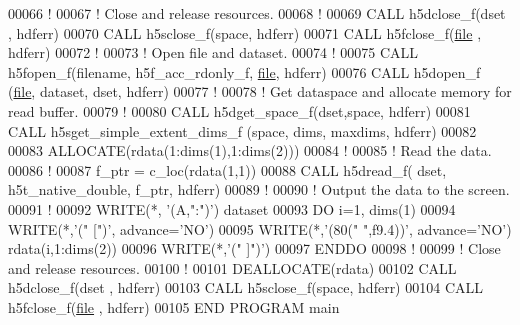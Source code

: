 \begin{DoxyCode}
00066   \textcolor{comment}{!}
00067   \textcolor{comment}{! Close and release resources.}
00068   \textcolor{comment}{!}
00069   \textcolor{keyword}{CALL }h5dclose\_f(dset , hdferr)
00070   \textcolor{keyword}{CALL }h5sclose\_f(space, hdferr)
00071   \textcolor{keyword}{CALL }h5fclose\_f(\hyperlink{structfile}{file} , hdferr)
00072   \textcolor{comment}{!}
00073   \textcolor{comment}{! Open file and dataset.}
00074   \textcolor{comment}{!}
00075   \textcolor{keyword}{CALL }h5fopen\_f(filename, h5f\_acc\_rdonly\_f, \hyperlink{structfile}{file}, hdferr)
00076   \textcolor{keyword}{CALL }h5dopen\_f (\hyperlink{structfile}{file}, dataset, dset, hdferr)
00077   \textcolor{comment}{!}
00078   \textcolor{comment}{! Get dataspace and allocate memory for read buffer.}
00079   \textcolor{comment}{!}
00080   \textcolor{keyword}{CALL }h5dget\_space\_f(dset,space, hdferr)
00081   \textcolor{keyword}{CALL }h5sget\_simple\_extent\_dims\_f (space, dims, maxdims, hdferr)
00082 
00083   \textcolor{keyword}{ALLOCATE}(rdata(1:dims(1),1:dims(2)))
00084   \textcolor{comment}{!}
00085   \textcolor{comment}{! Read the data.}
00086   \textcolor{comment}{!}
00087   f\_ptr = c\_loc(rdata(1,1))
00088   \textcolor{keyword}{CALL }h5dread\_f( dset, h5t\_native\_double, f\_ptr, hdferr)
00089   \textcolor{comment}{!}
00090   \textcolor{comment}{! Output the data to the screen.}
00091   \textcolor{comment}{!}
00092   \textcolor{keyword}{WRITE}(*, \textcolor{stringliteral}{'(A,":")'}) dataset
00093   \textcolor{keywordflow}{DO} i=1, dims(1)
00094      \textcolor{keyword}{WRITE}(*,\textcolor{stringliteral}{'(" [")'}, advance=\textcolor{stringliteral}{'NO'})
00095      \textcolor{keyword}{WRITE}(*,\textcolor{stringliteral}{'(80(" ",f9.4))'}, advance=\textcolor{stringliteral}{'NO'}) rdata(i,1:dims(2))
00096      \textcolor{keyword}{WRITE}(*,\textcolor{stringliteral}{'(" ]")'})
00097 \textcolor{keywordflow}{  ENDDO}
00098   \textcolor{comment}{!}
00099   \textcolor{comment}{! Close and release resources.}
00100   \textcolor{comment}{!}
00101   \textcolor{keyword}{DEALLOCATE}(rdata)
00102   \textcolor{keyword}{CALL }h5dclose\_f(dset , hdferr)
00103   \textcolor{keyword}{CALL }h5sclose\_f(space, hdferr)
00104   \textcolor{keyword}{CALL }h5fclose\_f(\hyperlink{structfile}{file} , hdferr)
00105 \textcolor{keyword}{END PROGRAM }main
\end{DoxyCode}

